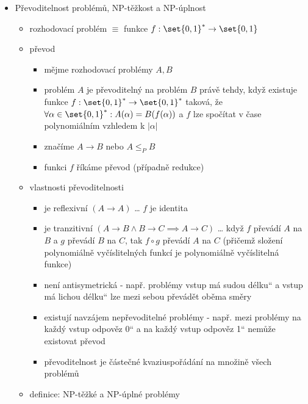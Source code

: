 \begin{itemize}
\begin{itemize}
\item problém $L\in \text{NP}\equiv\exists V\in \text P$ (verifikátor) $\exists g$ polynom (omezení délky certifikátů) $\forall x:L(x)=1\iff$ $\exists y$ certifikát $|y|\leq g(|x|)$ (krátký) $\land\;V(x,y)=1$ (schválený)
\item $\text P\subseteq\text{NP}$ (rovnost se neví)
\end{itemize}
\item Převoditelnost problémů, NP-těžkost a NP-úplnost
\begin{itemize}
\item rozhodovací problém $\equiv$ funkce $f:\set{0,1}^*\to\set{0,1}$
\item převod
\begin{itemize}
\item mějme rozhodovací problémy $A,B$
\item problém $A$ je převoditelný na problém $B$ právě tehdy, když existuje funkce $f:\set{0,1}^*\to\set{0,1}^*$ taková, že $\forall\alpha\in\set{0,1}^*:A(\alpha)=B(f(\alpha))$ a $f$ lze spočítat v čase polynomiálním vzhledem k $|\alpha|$
\item značíme $A\to B$ nebo $A\leq_P B$
\item funkci $f$ říkáme převod (případně redukce)
\end{itemize}
\item vlastnosti převoditelnosti
\begin{itemize}
\item je reflexivní $(A\to A)$ \dots{} $f$ je identita
\item je tranzitivní $(A\to B\land B\to C\implies A\to C)$ \dots{} když $f$ převádí $A$ na $B$ a $g$ převádí $B$ na $C$, tak $f\circ g$ převádí $A$ na $C$ (přičemž složení polynomiálně vyčíslitelných funkcí je polynomiálně vyčíslitelná funkce)
\item není antisymetrická - např. problémy \quotedblbase{}vstup má sudou délku\textquotedblleft{} a \quotedblbase{}vstup má lichou délku\textquotedblleft{} lze mezi sebou převádět oběma směry
\item existují navzájem nepřevoditelné problémy - např. mezi problémy \quotedblbase{}na každý vstup odpověz 0\textquotedblleft{} a \quotedblbase{}na každý vstup odpověz 1\textquotedblleft{} nemůže existovat převod
\item převoditelnost je částečné kvaziuspořádání na množině všech problémů
\end{itemize}
\item definice: NP-těžké a NP-úplné problémy

\end{itemize}
\end{itemize}
